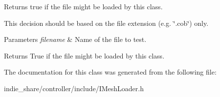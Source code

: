 Returns true if the file might be loaded by this class. 

This decision should be based on the file extension (e.\+g. \char`\"{}.\+cob\char`\"{}) only. 
\begin{DoxyParams}{Parameters}
{\em filename} & Name of the file to test. \\
\hline
\end{DoxyParams}
\begin{DoxyReturn}{Returns}
True if the file might be loaded by this class. 
\end{DoxyReturn}


The documentation for this class was generated from the following file\+:\begin{DoxyCompactItemize}
\item 
indie\+\_\+share/controller/include/I\+Mesh\+Loader.\+h\end{DoxyCompactItemize}
